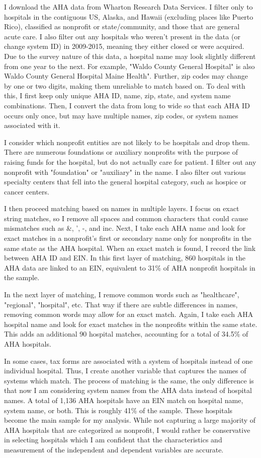 \documentclass[12pt]{article}
\begin{document}
    I download the AHA data from Wharton Research Data Services. I filter only to hospitals in the contiguous US, Alaska, and Hawaii (excluding places like Puerto Rico), classified as nonprofit or state/community, and those that are general acute care. I also filter out any hospitals who weren't present in the data (or change system ID) in 2009-2015, meaning they either closed or were acquired. Due to the survey nature of this data, a hospital name may look slightly different from one year to the next. For example, "Waldo County General Hospital" is also Waldo County General Hospital Maine Health". Further, zip codes may change by one or two digits, making them unreliable to match based on. To deal with this, I first keep only unique AHA ID, name, zip, state, and system name combinations. Then, I convert the data from long to wide so that each AHA ID occurs only once, but may have multiple names, zip codes, or system names associated with it.

    I consider which nonprofit entities are not likely to be hospitals and drop them. There are numerous foundations or auxiliary nonprofits with the purpose of raising funds for the hospital, but do not actually care for patient. I filter out any nonprofit with "foundation" or "auxiliary" in the name. I also filter out various specialty centers that fell into the general hospital category, such as hospice or cancer centers. 

    I then proceed matching based on names in multiple layers. I focus on exact string matches, so I remove all spaces and common characters that could cause mismatches such as \&, ', -, and inc. Next, I take each AHA name and look for exact matches in a nonprofit's first or secondary name only for nonprofits in the same state as the AHA hospital. When an exact match is found, I record the link between AHA ID and EIN. In this first layer of matching, 860 hospitals in the AHA data are linked to an EIN, equivalent to 31\% of AHA nonprofit hospitals in the sample. 

    In the next layer of matching, I remove common words such as "healthcare", "regional", "hospital", etc. That way if there are subtle differences in names, removing common words may allow for an exact match. Again, I take each AHA hospital name and look for exact matches in the nonprofits within the same state. This adds an additional 90 hospital matches, accounting for a total of 34.5\% of AHA hospitals. 

    In some cases, tax forms are associated with a system of hospitals instead of one individual hospital. Thus, I create another variable that captures the names of systems which match. The process of matching is the same, the only difference is that now I am considering system names from the AHA data instead of hospital names. A total of 1,136 AHA hospitals have an EIN match on hospital name, system name, or both. This is roughly 41\% of the sample. These hospitals become the main sample for my analysis. While not capturing a large majority of AHA hospitals that are categorized as nonprofit, I would rather be conservative in selecting hospitals which I am confident that the characteristics and measurement of the independent and dependent variables are accurate. 
\end{document}
